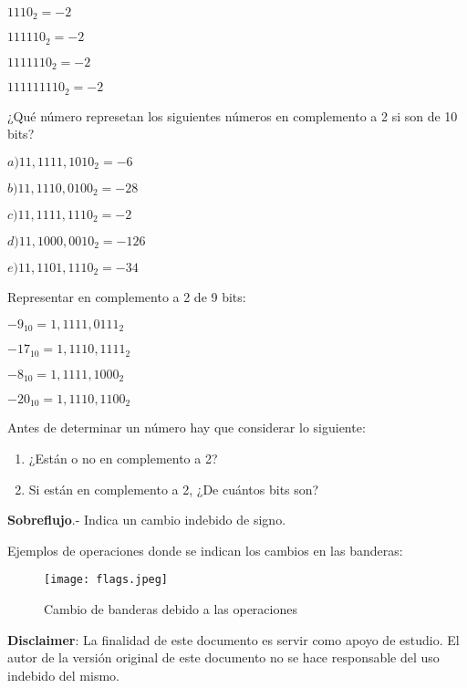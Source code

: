 \documentclass{article}
\begin{document}
$1110_{2} = -2$

$111110_{2} = -2$

$1111110_{2} = -2$

$111111110_{2} = -2$

\vspace{1em}
¿Qué número represetan los siguientes números en complemento a 2 si son de 10
bits?

\vspace{1em}
$a) 11,1111,1010_{2} = -6$

$b) 11,1110,0100_{2} = -28$

$c) 11,1111,1110_{2} = -2$

$d) 11,1000,0010_{2} = -126$

$e) 11,1101,1110_{2} = -34$

\vspace{1em}
Representar en complemento a 2 de 9 bits:

\vspace{1em}
$-9_{10} = 1,1111,0111_{2}$

$-17_{10} = 1,1110,1111_{2}$

$-8_{10} = 1,1111,1000_{2}$

$-20_{10} = 1,1110,1100_{2}$

\vspace{1em}
Antes de determinar un número hay que considerar lo siguiente:

\begin{enumerate}
	\item
		¿Están o no en complemento a 2?
	\item
		Si están en complemento a 2, ¿De cuántos bits son?
\end{enumerate}

\vspace{1em}
\textbf{Sobreflujo}.- Indica un cambio indebido de signo.

\newpage

\vspace{1em}
Ejemplos de operaciones donde se indican los cambios en las banderas:

\begin{figure}[h!]
	\centerline{\texttt{[image: flags.jpeg]}}
	\caption{Cambio de banderas debido a las operaciones}
	\label{fig:flags}
\end{figure}

\vspace{1em}
\textbf{Disclaimer}: La finalidad de este documento es servir como apoyo de estudio.
El autor de la versión original de este documento no se hace responsable del
uso indebido del mismo.
\end{document}
